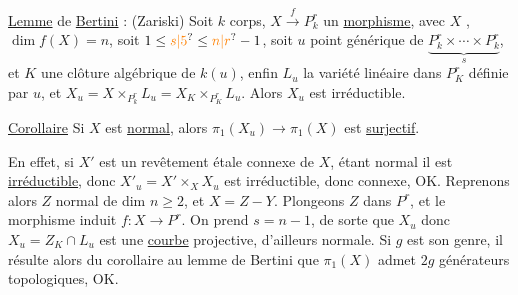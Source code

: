 \uline{Lemme} de \uline{Bertini} : (Zariski) Soit $k$ corps,
$X\xrightarrow{f}P^r_k$ un \uline{morphisme}, avec $X$ ,
$\dim f(X)=n$, soit $1\leq\unsure{s|5}\leq\unsure{n|r}-1$,  soit
$u$  point générique de $\underbrace{P^r_k\times\cdots\times P^r_k}_{s}$, et
$K$ une clôture algébrique de $k(u)$, enfin
$L_u$ la variété linéaire dans $P^r_K$ définie
par $u$, et $X_u=X\times_{P^r_k}L_u=X_K\times_{P^r_K} L_u$.
Alors $X_u$ est irréductible.


\uline{Corollaire}  Si $X$ est \uline{normal},
alors $\pi_1(X_u)\to\pi_1(X)$ est \uline{surjectif}.

En effet, si $X'$ est un revêtement 
étale connexe de $X$, étant normal il est
\uline{irréductible}, donc $X'_u=X'\times_X X_u$ est
irréductible, donc connexe, OK.
Reprenons alors $Z$ normal de dim $n\geq 2$, et
$X=Z-Y$. Plongeons $Z$ dans $P^r$, et le morphisme
induit $f:X\to P^r$. On prend $s=n-1$, de
sorte que $X_u$  
donc $X_u=Z_K\cap L_u$ est une \uline{courbe}  projective, d'ailleurs normale. Si $g$
est son genre, il résulte alors du corollaire
au lemme de Bertini que $\pi_1(X)$ admet
$2g$ générateurs topologiques, OK.


